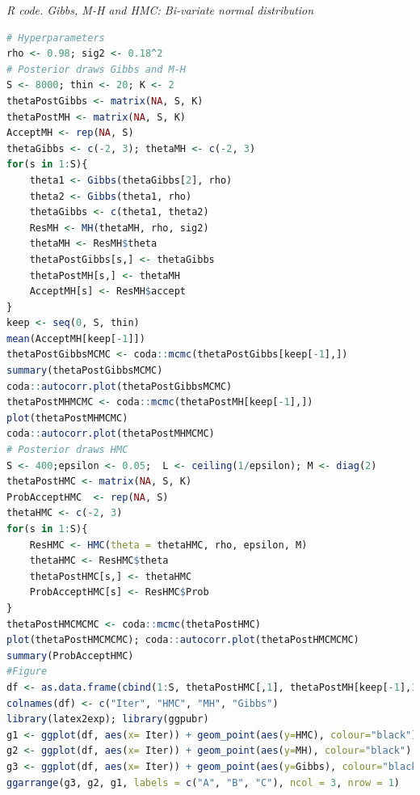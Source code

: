\begin{tcolorbox}[enhanced,width=4.67in,center upper,
	fontupper=\large\bfseries,drop shadow southwest,sharp corners]
	\textit{R code. Gibbs, M-H and HMC: Bi-variate normal distribution}
	\begin{VF}
		\begin{lstlisting}[language=R]
# Hyperparameters
rho <- 0.98; sig2 <- 0.18^2
# Posterior draws Gibbs and M-H
S <- 8000; thin <- 20; K <- 2
thetaPostGibbs <- matrix(NA, S, K)
thetaPostMH <- matrix(NA, S, K)
AcceptMH <- rep(NA, S)
thetaGibbs <- c(-2, 3); thetaMH <- c(-2, 3)
for(s in 1:S){
	theta1 <- Gibbs(thetaGibbs[2], rho)
	theta2 <- Gibbs(theta1, rho)
	thetaGibbs <- c(theta1, theta2)
	ResMH <- MH(thetaMH, rho, sig2)
	thetaMH <- ResMH$theta
	thetaPostGibbs[s,] <- thetaGibbs
	thetaPostMH[s,] <- thetaMH
	AcceptMH[s] <- ResMH$accept
}
keep <- seq(0, S, thin)
mean(AcceptMH[keep[-1]])
thetaPostGibbsMCMC <- coda::mcmc(thetaPostGibbs[keep[-1],])
summary(thetaPostGibbsMCMC)
coda::autocorr.plot(thetaPostGibbsMCMC)
thetaPostMHMCMC <- coda::mcmc(thetaPostMH[keep[-1],])
plot(thetaPostMHMCMC)
coda::autocorr.plot(thetaPostMHMCMC)
# Posterior draws HMC
S <- 400;epsilon <- 0.05;  L <- ceiling(1/epsilon); M <- diag(2)
thetaPostHMC <- matrix(NA, S, K)
ProbAcceptHMC  <- rep(NA, S)
thetaHMC <- c(-2, 3)
for(s in 1:S){
	ResHMC <- HMC(theta = thetaHMC, rho, epsilon, M)
	thetaHMC <- ResHMC$theta
	thetaPostHMC[s,] <- thetaHMC
	ProbAcceptHMC[s] <- ResHMC$Prob
}
thetaPostHMCMCMC <- coda::mcmc(thetaPostHMC)
plot(thetaPostHMCMCMC); coda::autocorr.plot(thetaPostHMCMCMC)
summary(ProbAcceptHMC)
#Figure
df <- as.data.frame(cbind(1:S, thetaPostHMC[,1], thetaPostMH[keep[-1],1], thetaPostGibbs[keep[-1],1]))
colnames(df) <- c("Iter", "HMC", "MH", "Gibbs")
library(latex2exp); library(ggpubr)
g1 <- ggplot(df, aes(x= Iter)) + geom_point(aes(y=HMC), colour="black") + labs(x = "Iteration", y = TeX("$\\theta_{1}$"), title = "HMC algorithm")
g2 <- ggplot(df, aes(x= Iter)) + geom_point(aes(y=MH), colour="black") + labs(x = "Iteration", y = TeX("$\\theta_{1}$"), title = "M-H algorithm")
g3 <- ggplot(df, aes(x= Iter)) + geom_point(aes(y=Gibbs), colour="black") + labs(x = "Iteration", y = TeX("$\\theta_{1}$"), title = "Gibbs sampling")
ggarrange(g3, g2, g1, labels = c("A", "B", "C"), ncol = 3, nrow = 1)
\end{lstlisting}
	\end{VF}
\end{tcolorbox} 

